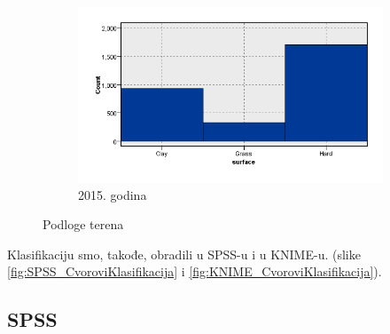 \documentclass[a4paper]{article}
\begin{document}
\begin{figure}[H]
	\begin{subfigure}[h]{\textwidth}
		\begin{center}
			\includegraphics[scale=0.30]{Klasifikacija/HistogramiPodlogaTerena/Graphboard2015.png}
		\end{center}
		\caption{2015. godina}
		\label{fig:Podloga2015}
	\end{subfigure}
	
	\caption{Podloge terena}
	\label{fig:Podloga}
\end{figure} 

Klasifikaciju smo, takođe, obradili u SPSS-u i u KNIME-u. (slike \ref{fig:SPSS_CvoroviKlasifikacija} i \ref{fig:KNIME_CvoroviKlasifikacija}).

\subsection{SPSS}
\end{document}
